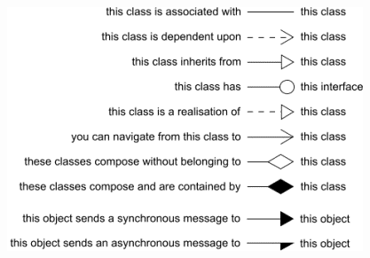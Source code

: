 \documentclass{article}[18pt]
\begin{document}
\begin{center}
	\includegraphics[scale=0.7]{"Class Diagrams1"}
\end{center}
\end{document}

